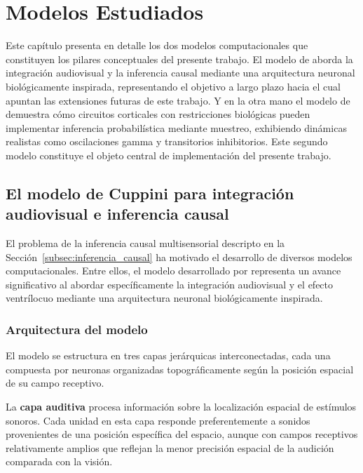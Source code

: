 \chapter{Modelos Estudiados}
\label{chapter:modelos_estudiados}

Este capítulo presenta en detalle los dos modelos computacionales que constituyen los pilares conceptuales del presente trabajo. El modelo de \citeauthor{cuppini2017biologically} aborda la integración audiovisual y la inferencia causal mediante una arquitectura neuronal biológicamente inspirada, representando el objetivo a largo plazo hacia el cual apuntan las extensiones futuras de este trabajo. Y en la otra mano el modelo de \citeauthor{echeveste2020cortical} demuestra cómo circuitos corticales con restricciones biológicas pueden implementar inferencia probabilística mediante muestreo, exhibiendo dinámicas realistas como oscilaciones gamma y transitorios inhibitorios. Este segundo modelo constituye el objeto central de implementación del presente trabajo.


\section{El modelo de Cuppini para integración audiovisual e inferencia causal}
\label{sec:modelo_cuppini}

El problema de la inferencia causal multisensorial descripto en la Sección~\ref{subsec:inferencia_causal} ha motivado el desarrollo de diversos modelos computacionales. Entre ellos, el modelo desarrollado por \citet{cuppini2017biologically} representa un avance significativo al abordar específicamente la integración audiovisual y el efecto ventrílocuo mediante una arquitectura neuronal biológicamente inspirada.

\subsection{Arquitectura del modelo}
\label{subsec:cuppini_arquitectura}

El modelo se estructura en tres capas jerárquicas interconectadas, cada una compuesta por neuronas organizadas topográficamente según la posición espacial de su campo receptivo.

La \textbf{capa auditiva} procesa información sobre la localización espacial de estímulos sonoros. Cada unidad en esta capa responde preferentemente a sonidos provenientes de una posición específica del espacio, aunque con campos receptivos relativamente amplios que reflejan la menor precisión espacial de la audición comparada con la visión.

